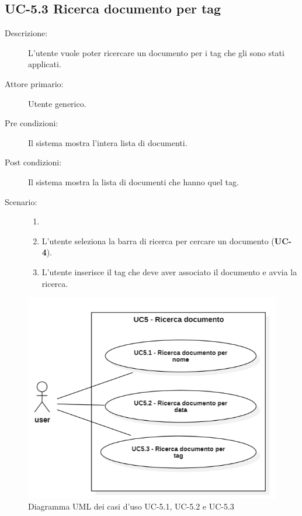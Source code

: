 \subsection{UC-5.3 Ricerca documento per tag}
\begin{description}
    \item[Descrizione:] L’utente vuole poter ricercare un documento per i tag che gli sono stati applicati.
    \item[Attore primario:] Utente generico.
    \item[Pre condizioni:] Il sistema mostra l’intera lista di documenti.
    \item[Post condizioni:] Il sistema mostra la lista di documenti che hanno quel tag.
    \item[Scenario:] 
    \begin{enumerate}
        \item[]
        \item L’utente seleziona la barra di ricerca per cercare un documento (\textbf{UC-4}).
        \item L’utente inserisce il tag che deve aver associato il documento e avvia la ricerca.
    \end{enumerate}
\end{description}

\begin{figure}[H]
    \centering
    \includegraphics[width=0.8\linewidth]{UC5.1.png} %
    \caption{Diagramma UML dei casi d'uso UC-5.1, UC-5.2 e UC-5.3}
    \label{fig:UC4.1-2-3}
\end{figure}

